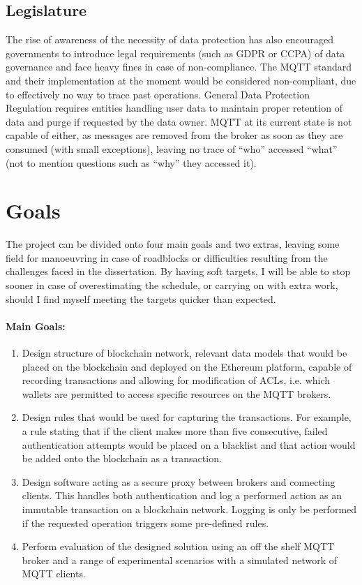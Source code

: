 \subsection{Legislature}
The rise of awareness of the necessity of data protection has also encouraged governments to introduce legal requirements (such as GDPR or CCPA) of data governance and face heavy fines in case of non-compliance. The MQTT standard and their implementation at the moment would be considered non-compliant, due to effectively no way to trace past operations. General Data Protection Regulation requires entities handling user data to maintain proper retention of data and purge if requested by the data owner. MQTT at its current state is not capable of either, as messages are removed from the broker as soon as they are consumed (with small exceptions), leaving no trace of ``who'' accessed ``what'' (not to mention questions such as ``why'' they accessed it).


\section{Goals}

The project can be divided onto four main goals and two extras, leaving some field for manoeuvring in case of roadblocks or difficulties resulting from the challenges faced in the dissertation. By having soft targets, I will be able to stop sooner in case of overestimating the schedule, or carrying on with extra work, should I find myself meeting the targets quicker than expected. 

\paragraph{Main Goals:}
\begin{enumerate}
  \item Design structure of blockchain network, relevant data models that would be placed on the blockchain and deployed on the Ethereum platform, capable of recording transactions and allowing for modification of ACLs, i.e. which wallets are permitted to access specific resources on the MQTT brokers.
  \item Design rules that would be used for capturing the transactions. For example, a rule stating that if the client makes more than five consecutive, failed authentication attempts would be placed on a blacklist and that action would be added onto the blockchain as a transaction. 
  \item Design software acting as a secure proxy between brokers and connecting clients. This handles both authentication and log a performed action as an immutable transaction on a blockchain network. Logging is only be performed if the requested operation triggers some pre-defined rules.
  \item Perform evaluation of the designed solution using an off the shelf MQTT broker and a range of experimental scenarios with a simulated network of MQTT clients.
\end{enumerate}

